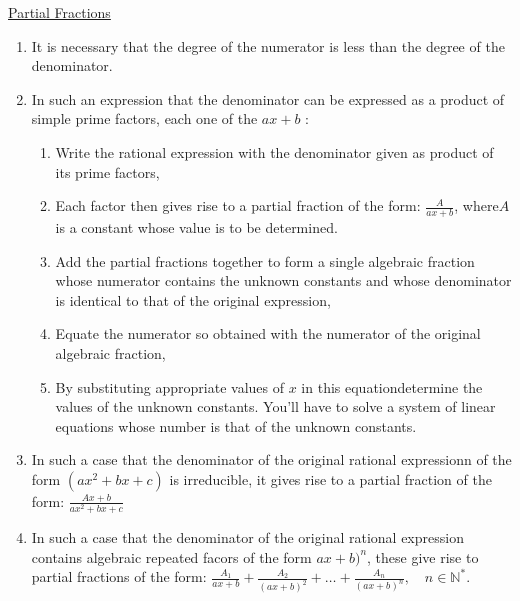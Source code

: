 \documentclass[12pt]{article}
\begin{document}
\begin{flushleft}
	\textbullet \quad \uline{Partial Fractions}  
	\begin{enumerate}
	\item It is necessary that the degree of the numerator is less than the degree of the denominator. 
	\item In such an expression that the denominator can be expressed as a product of simple prime factors, each one of the $ax+b$  :  
		\begin{enumerate}
		\item Write the rational expression with the denominator given as product of its prime factors, 
		\item Each factor then gives rise to a partial fraction of the form: $\displaystyle \frac{A}{ax + b}$, where$A$ is a constant whose value is to be determined.
		\item Add the partial fractions together to form a single algebraic fraction whose numerator contains the unknown constants and whose denominator is identical to that of the original expression, 
		\item Equate the numerator so obtained with the numerator of the original algebraic fraction, 
		\item By substituting appropriate values of $x$ in this equationdetermine the values of the unknown constants. You'll have to solve a system of linear equations whose number is that of the unknown constants.
		\end{enumerate}	
	
	\item In such a case that the denominator of the original rational expressionn of the form $(ax^2 +bx +c)$ is irreducible, it gives rise to a partial fraction of the form: $\displaystyle \frac{Ax+b}{ax^2+bx+c}$ 
	\item In such a case that the denominator of the original rational expression contains algebraic repeated facors of the form $ax+b)^n$, these give rise to partial fractions of the form: $\displaystyle \frac{A_1}{ax+b} + \frac{A_2}{(ax+b)^2} + \ldots + \frac{A_n}{(ax+b)^n}, \quad n\in \mathbb{N}^*.$ \linebreak 
	\end{enumerate}
	

\end{flushleft}
\end{document}
